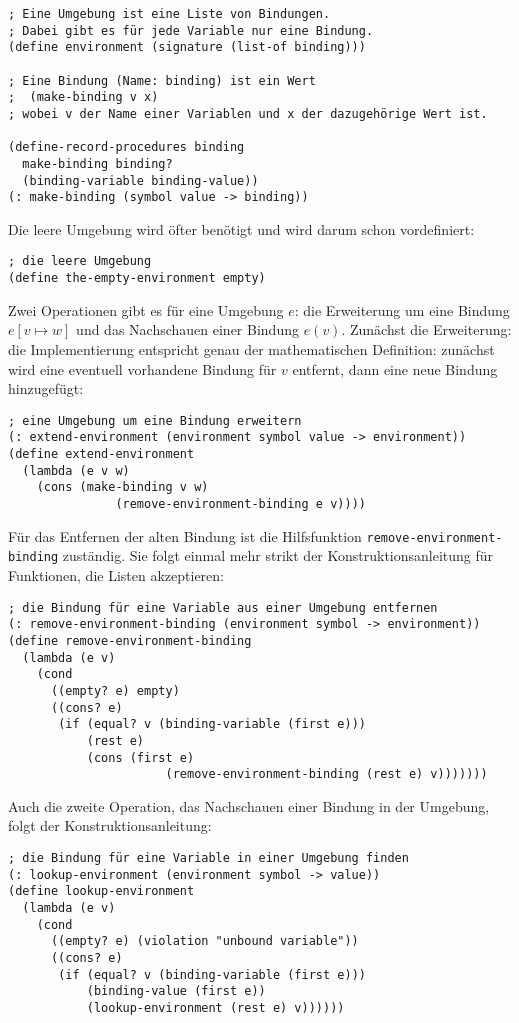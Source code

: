 \begin{verbatim}
; Eine Umgebung ist eine Liste von Bindungen.
; Dabei gibt es für jede Variable nur eine Bindung.
(define environment (signature (list-of binding)))

; Eine Bindung (Name: binding) ist ein Wert
;  (make-binding v x)
; wobei v der Name einer Variablen und x der dazugehörige Wert ist.

(define-record-procedures binding
  make-binding binding?
  (binding-variable binding-value))
(: make-binding (symbol value -> binding))
\end{verbatim}
% 
Die leere Umgebung wird öfter benötigt und wird darum schon
vordefiniert:
%
\begin{verbatim}
; die leere Umgebung
(define the-empty-environment empty)
\end{verbatim}
%
Zwei Operationen gibt es für eine Umgebung $e$: die Erweiterung um
eine Bindung $e[v\mapsto w]$ und das Nachschauen einer Bindung
$e(v)$.  Zunächst die Erweiterung: die Implementierung entspricht
genau der mathematischen Definition: zunächst wird eine eventuell
vorhandene Bindung für $v$ entfernt, dann eine neue Bindung
hinzugefügt:
% 
\begin{verbatim}
; eine Umgebung um eine Bindung erweitern
(: extend-environment (environment symbol value -> environment))
(define extend-environment
  (lambda (e v w)
    (cons (make-binding v w)
               (remove-environment-binding e v))))
\end{verbatim}
%
Für das Entfernen der alten Bindung ist die Hilfsfunktion
\texttt{remove-environment-binding} zuständig.  Sie folgt einmal mehr
strikt der Konstruktionsanleitung für Funktionen, die Listen akzeptieren:
\begin{verbatim}
; die Bindung für eine Variable aus einer Umgebung entfernen
(: remove-environment-binding (environment symbol -> environment))
(define remove-environment-binding
  (lambda (e v)
    (cond
      ((empty? e) empty)
      ((cons? e)
       (if (equal? v (binding-variable (first e)))
           (rest e)
           (cons (first e)
                      (remove-environment-binding (rest e) v)))))))
\end{verbatim} 
%
Auch die zweite Operation, das Nachschauen einer Bindung in der
Umgebung, folgt der Konstruktionsanleitung:
%
%
\begin{verbatim}
; die Bindung für eine Variable in einer Umgebung finden
(: lookup-environment (environment symbol -> value))
(define lookup-environment
  (lambda (e v)
    (cond
      ((empty? e) (violation "unbound variable"))
      ((cons? e)
       (if (equal? v (binding-variable (first e)))
           (binding-value (first e))
           (lookup-environment (rest e) v))))))
\end{verbatim}
